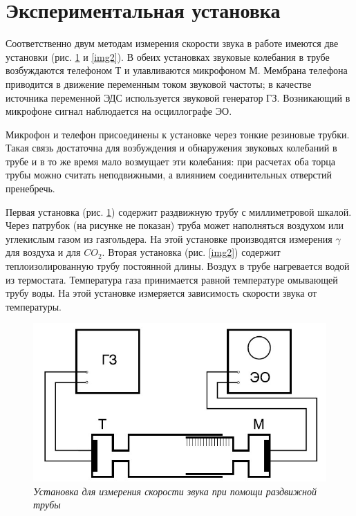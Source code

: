 \documentclass[a4paper,12pt]{article}
\theoremstyle{definition}
\begin{document}
	\section{Экспериментальная установка}
	
	Соответственно двум методам измерения скорости звука в работе имеются две установки (рис. \ref{img1} и \ref{img2}). В обеих установках звуковые колебания в трубе возбуждаются телефоном Т и улавливаются микрофоном М. Мембрана телефона приводится в движение переменным током звуковой частоты; в качестве источника переменной ЭДС используется звуковой генератор ГЗ. Возникающий в микрофоне сигнал наблюдается на осциллографе ЭО.
	
	Микрофон и телефон присоединены к установке через тонкие резиновые трубки. Такая связь достаточна для возбуждения и обнаружения звуковых колебаний в трубе и в то же время мало возмущает эти колебания: при расчетах оба торца трубы можно считать неподвижными, а влиянием соединительных отверстий пренебречь.
	
	Первая установка (рис. \ref{img1}) содержит раздвижную трубу с миллиметровой шкалой. Через патрубок (на рисунке не показан) труба может наполняться воздухом или углекислым газом из газгольдера. На этой установке производятся измерения $ \gamma $ для воздуха и для $ CO_2 $. Вторая установка (рис. \ref{img2}) содержит теплоизолированную трубу постоянной длины. Воздух в трубе нагревается водой из термостата. Температура газа принимается равной температуре омывающей трубу воды. На этой установке измеряется зависимость скорости звука от температуры.
	
	\begin{figure}[H]
		\begin{center}
			\includegraphics[width=12cm]{ust1.jpg}
		\end{center}
		\caption{\textit{Установка для измерения скорости звука при помощи раздвижной трубы}}
		\label{img1}
	\end{figure}
	
\end{document}
